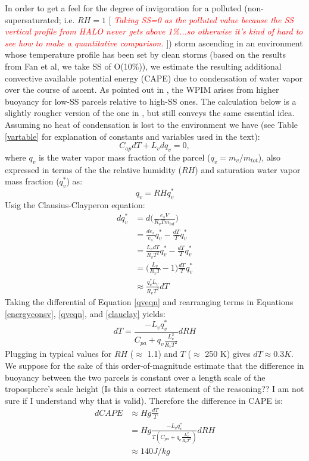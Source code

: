 \documentclass{article}
\newcommand{\klcomm}[1]{\textcolor{red}{\textit{#1}}}
\begin{document}
In order to get a feel for the degree of invigoration for a polluted (non-supersaturated; i.e. $RH=1$ [ \klcomm{Taking SS=0 as the polluted value because the SS vertical profile from HALO never gets above 1\%...so otherwise it's kind of hard to see how to make a quantitative comparison.} ]) storm ascending in an environment whose temperature profile has been set by clean storms (based on the results from Fan et al, we take SS of O(10\%)), we estimate the resulting additional convective available potential energy (CAPE) due to condensation of water vapor over the course of ascent. As pointed out in \cite{Grabowski2020}, the WPIM arises from higher buoyancy for low-SS parcels relative to high-SS ones. The calculation below is a slightly rougher version of the one in \cite{Grabowski2015}, but still conveys the same essential idea. Assuming no heat of condensation is lost to the environment we have (see Table \ref{vartable} for explanation of constants and variables used in the text):
\begin{equation}
\label{energyconsv}
C_{ap}dT + L_vdq_v = 0,
\end{equation}
where $q_v$ is the water vapor mass fraction of the parcel ($q_v=m_v/m_{tot}$), also expressed in terms of the the relative humidity ($RH$) and saturation water vapor mass fraction ($q_v^*$) as:
\begin{equation}
\label{qveqn}
q_v = RHq_v^*
\end{equation}
Usig the Clausius-Clayperon equation:
\begin{align}
\label{clauclay}
dq_v^* &= d\Big(\frac{e_sV}{R_vTm_{tot}}\Big)\nonumber\\
&=\frac{de_s}{e_s}q_v^* - \frac{dT}{T}q_v^*\nonumber\\
&=\frac{L_vdT}{R_vT^2}q_v^* - \frac{dT}{T}q_v^*\nonumber\\
&=\Big(\frac{L_v}{R_vT} - 1\Big)\frac{dT}{T}q_v^*\nonumber\\
&\approx \frac{q_v^*L_v}{R_vT^2}dT
\end{align}
Taking the differential of Equation \ref{qveqn} and rearranging terms in Equations \ref{energyconsv}, \ref{qveqn}, and \ref{clauclay} yields:
\begin{equation}
dT = \frac{-L_vq_v^*}{C_{pa} + q_v\frac{L_v^2}{R_vT^2}}dRH
\end{equation}
Plugging in typical values for $RH$ ($\approx$ 1.1) and $T$ ($\approx$ 250 K) gives $dT\approx 0.3K$. We suppose for the sake of this order-of-magnitude estimate that the difference in buoyancy between the two parcels is constant over a length scale of the troposphere's scale height (Is this a correct statement of the reasoning?? I am not sure if I understand why that is valid). Therefore the difference in CAPE is:
\begin{align}
dCAPE &\approx Hg \frac{dT}{T}\nonumber\\
&=Hg\frac{-L_vq_v^*}{T(C_{pa} + q_v\frac{L_v^2}{R_vT^2})}dRH\nonumber\\
&\approx 140 J/kg
\end{align}
\end{document}
